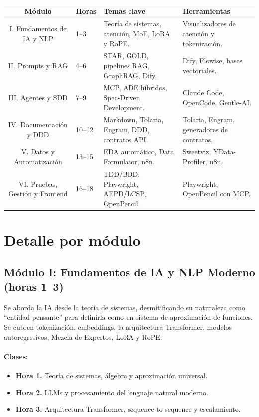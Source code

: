 \documentclass[11pt,a4paper]{article}
\renewcommand{\arraystretch}{1.25}
\begin{document}
\begin{table}[h]
  \centering
  \small
  \renewcommand{\arraystretch}{1.35}
  \begin{tabularx}{\linewidth}{c Y Y Y}
    \toprule
    \color{white}\textbf{Módulo} & \color{white}\textbf{Horas} & \color{white}\textbf{Temas clave} & \color{white}\textbf{Herramientas} \\
    \midrule
    I. Fundamentos de IA y NLP & 1--3 & Teoría de sistemas, atención, MoE, LoRA y RoPE. & Visualizadores de atención y tokenización. \\
    II. Prompts y RAG & 4--6 & STAR, GOLD, pipelines RAG, GraphRAG, Dify. & Dify, Flowise, bases vectoriales. \\
    III. Agentes y SDD & 7--9 & MCP, ADE híbridos, Spec-Driven Development. & Claude Code, OpenCode, Gentle-AI. \\
    IV. Documentación y DDD & 10--12 & Markdown, Tolaria, Engram, DDD, contratos API. & Tolaria, Engram, generadores de contratos. \\
    V. Datos y Automatización & 13--15 & EDA automático, Data Formulator, n8n. & Sweetviz, YData-Profiler, n8n. \\
    VI. Pruebas, Gestión y Frontend & 16--18 & TDD/BDD, Playwright, AEPD/LCSP, OpenPencil. & Playwright, OpenPencil con MCP. \\
    \bottomrule
  \end{tabularx}
\end{table}

\section{Detalle por módulo}

\subsection{Módulo I: Fundamentos de IA y NLP Moderno (horas 1--3)}

Se aborda la IA desde la teoría de sistemas, desmitificando su naturaleza como ``entidad pensante'' para definirla como un sistema de aproximación de funciones. Se cubren tokenización, embeddings, la arquitectura Transformer, modelos autoregresivos, Mezcla de Expertos, LoRA y RoPE.

\paragraph{Clases:}
\begin{itemize}
  \item \textbf{Hora 1.} Teoría de sistemas, álgebra y aproximación universal.
  \item \textbf{Hora 2.} LLMs y procesamiento del lenguaje natural moderno.
  \item \textbf{Hora 3.} Arquitectura Transformer, sequence-to-sequence y escalamiento.
\end{itemize}
\end{document}
